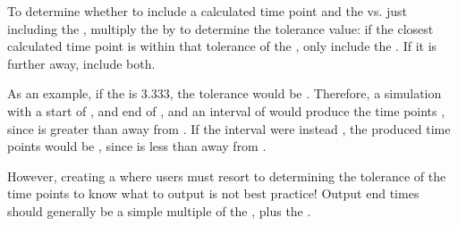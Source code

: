 \begin{blockChanged}
\begin{itemize}
    To determine whether to include a calculated time point and the  vs. just including the , multiply the  by  to determine the tolerance value:  if the closest calculated time point is within that tolerance of the , only include the .  If it is further away, include both.

    As an example, if the  is 3.333, the tolerance would be .  Therefore, a simulation with a start of , and end of , and an interval of  would produce the time points \code{[0, 3.333, 6.666, 9.999, 10]}, since  is greater than  away from .  If the interval were instead , the produced time points would be \code{[0, 3.333333, 6.666666, 10]}, since  is less than  away from .

    However, creating a \UniformTimeCourse where users must resort to determining the tolerance of the time points to know what to output is not best practice!  Output end times should generally be a simple multiple of the , plus the .
\end{itemize}
\end{blockChanged}

